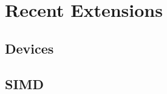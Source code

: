 \section{Recent Extensions}
\label{sec:recent_extensions}

\subsection{Devices}
\label{sub:devices}

\subsection{SIMD}
\label{sub:simd}





